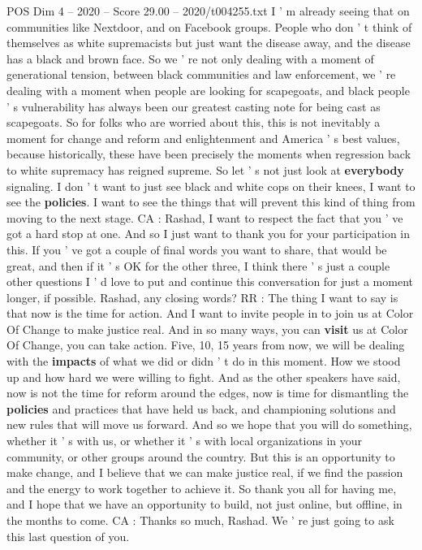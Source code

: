 \begin{textsample}{POS Dim 4 – 2020 – Score 29.00 – 2020/t004255.txt}
I ' m already seeing that on communities like Nextdoor, and on Facebook groups.
People who don ' t think of themselves as white supremacists but just want the disease away, and the disease has a black and brown face.
So we ' re not only dealing with a moment of generational tension, between black communities and law enforcement, we ' re dealing with a moment when people are looking for scapegoats, and black people ' s vulnerability has always been our greatest casting note for being cast as scapegoats.
So for folks who are worried about this, this is not inevitably a moment for change and reform and enlightenment and America ' s best values, because historically, these have been precisely the moments when regression back to white supremacy has reigned supreme.
So let ' s not just look at \textbf{everybody} signaling.
I don ' t want to just see black and white cops on their knees, I want to see the \textbf{policies}.
I want to see the things that will prevent this kind of thing from moving to the next stage.
CA : Rashad, I want to respect the fact that you ' ve got a hard stop at one.
And so I just want to thank you for your participation in this.
If you ' ve got a couple of final words you want to share, that would be great, and then if it ' s OK for the other three, I think there ' s just a couple other questions I ' d love to put and continue this conversation for just a moment longer, if possible.
Rashad, any closing words?
RR : The thing I want to say is that now is the time for action.
And I want to invite people in to join us at Color Of Change to make justice real.
And in so many ways, you can \textbf{visit} us at Color Of Change, you can take action.
Five, 10, 15 years from now, we will be dealing with the \textbf{impacts} of what we did or didn ' t do in this moment.
How we stood up and how hard we were willing to fight.
And as the other speakers have said, now is not the time for reform around the edges, now is time for dismantling the \textbf{policies} and practices that have held us back, and championing solutions and new rules that will move us forward.
And so we hope that you will do something, whether it ' s with us, or whether it ' s with local organizations in your community, or other groups around the country.
But this is an opportunity to make change, and I believe that we can make justice real, if we find the passion and the energy to work together to achieve it.
So thank you all for having me, and I hope that we have an opportunity to build, not just online, but offline, in the months to come.
CA : Thanks so much, Rashad.
We ' re just going to ask this last question of you.

\end{textsample}

